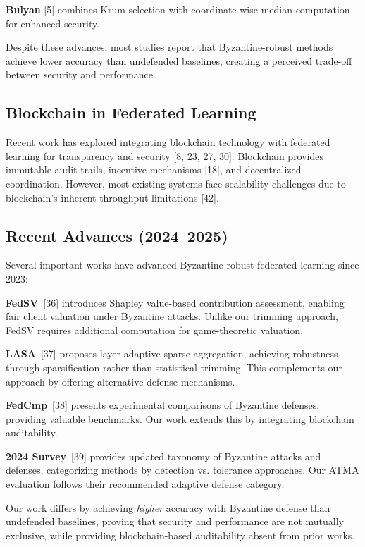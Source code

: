 \documentclass[12pt,a4paper,onecolumn]{article}
\begin{document}
\textbf{Bulyan} [5] combines Krum selection with coordinate-wise median computation for enhanced security.

Despite these advances, most studies report that Byzantine-robust methods achieve lower accuracy than undefended baselines, creating a perceived trade-off between security and performance.

\subsection{Blockchain in Federated Learning}

Recent work has explored integrating blockchain technology with federated learning for transparency and security [8, 23, 27, 30]. Blockchain provides immutable audit trails, incentive mechanisms [18], and decentralized coordination. However, most existing systems face scalability challenges due to blockchain's inherent throughput limitations [42].

\subsection{Recent Advances (2024--2025)}

Several important works have advanced Byzantine-robust federated learning since 2023:

\textbf{FedSV}~[36] introduces Shapley value-based contribution assessment, enabling fair client valuation under Byzantine attacks. Unlike our trimming approach, FedSV requires additional computation for game-theoretic valuation.

\textbf{LASA}~[37] proposes layer-adaptive sparse aggregation, achieving robustness through sparsification rather than statistical trimming. This complements our approach by offering alternative defense mechanisms.

\textbf{FedCmp}~[38] presents experimental comparisons of Byzantine defenses, providing valuable benchmarks. Our work extends this by integrating blockchain auditability.

\textbf{2024 Survey}~[39] provides updated taxonomy of Byzantine attacks and defenses, categorizing methods by detection vs. tolerance approaches. Our ATMA evaluation follows their recommended adaptive defense category.

Our work differs by achieving \textit{higher} accuracy with Byzantine defense than undefended baselines, proving that security and performance are not mutually exclusive, while providing blockchain-based auditability absent from prior works.
\end{document}
